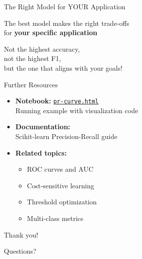 \documentclass{beamer}
\begin{document}
\begin{frame}{The Right Model for YOUR Application}
\begin{center}
\Large
The best model makes the right trade-offs \\
for \textbf{your specific application}

\vspace{0.2cm}

Not the highest accuracy, \\
not the highest F1, \\
but the one that aligns with your goals!
\end{center}
\end{frame}

\begin{frame}{Further Resources}
\begin{itemize}
    \item \textbf{Notebook:} \href{https://nipunbatra.github.io/ml-teaching/notebooks/pr-curve.html}{\texttt{pr-curve.html}} \\
          Running example with visualization code

    \item \textbf{Documentation:} \\
          Scikit-learn Precision-Recall guide

    \item \textbf{Related topics:}
    \begin{itemize}
        \item ROC curves and AUC
        \item Cost-sensitive learning
        \item Threshold optimization
        \item Multi-class metrics
    \end{itemize}
\end{itemize}
\end{frame}

\begin{frame}
\begin{center}
\Huge
Thank you!

\vspace{1cm}

\Large
Questions?
\end{center}
\end{frame}
\end{document}
